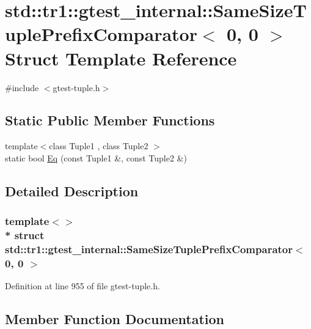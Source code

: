 \hypertarget{structstd_1_1tr1_1_1gtest__internal_1_1_same_size_tuple_prefix_comparator_3_010_00_010_01_4}{}\section{std\+:\+:tr1\+:\+:gtest\+\_\+internal\+:\+:Same\+Size\+Tuple\+Prefix\+Comparator$<$ 0, 0 $>$ Struct Template Reference}
\label{structstd_1_1tr1_1_1gtest__internal_1_1_same_size_tuple_prefix_comparator_3_010_00_010_01_4}


{\ttfamily \#include $<$gtest-\/tuple.\+h$>$}

\subsection*{Static Public Member Functions}
\begin{DoxyCompactItemize}
\item 
{\footnotesize template$<$class Tuple1 , class Tuple2 $>$ }\\static bool \hyperlink{structstd_1_1tr1_1_1gtest__internal_1_1_same_size_tuple_prefix_comparator_3_010_00_010_01_4_a4f209822266c6bb1832c49750a11ef95}{Eq} (const Tuple1 \&, const Tuple2 \&)
\end{DoxyCompactItemize}


\subsection{Detailed Description}
\subsubsection*{template$<$$>$\\*
struct std\+::tr1\+::gtest\+\_\+internal\+::\+Same\+Size\+Tuple\+Prefix\+Comparator$<$ 0, 0 $>$}



Definition at line 955 of file gtest-\/tuple.\+h.



\subsection{Member Function Documentation}

